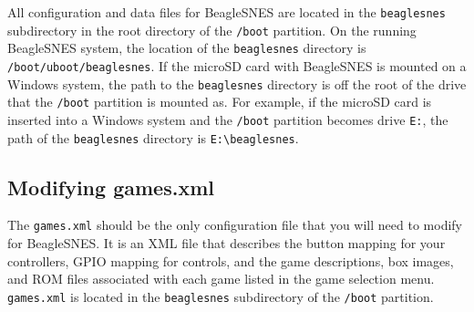 All configuration and data files for BeagleSNES are located in the \texttt{beaglesnes} subdirectory in the root directory of the \texttt{/boot} partition.  On the running BeagleSNES system, the location of the \texttt{beaglesnes} directory is \texttt{/boot/uboot/beaglesnes}.  If the microSD card with BeagleSNES is mounted on a Windows system, the path to the \texttt{beaglesnes} directory is off the root of the drive that the \texttt{/boot} partition is mounted as.  For example, if the microSD card is inserted into a Windows system and the \texttt{/boot} partition becomes drive \texttt{E:}, the path of the \texttt{beaglesnes} directory is \texttt{E:\textbackslash beaglesnes}.

\subsection{Modifying games.xml}\label{sec:games_xml}

The \texttt{games.xml} should be the only configuration file that you will need to modify for BeagleSNES.  It is an XML file that describes the button mapping for your controllers, GPIO mapping for controls, and the game descriptions, box images, and ROM files associated with each game listed in the game selection menu. \texttt{games.xml} is located in the \texttt{beaglesnes} subdirectory of the \texttt{/boot} partition.

